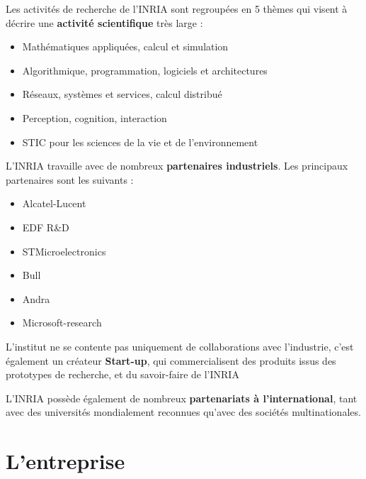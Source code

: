 \documentclass[a4paper, 11pt]{report}
\begin{document}
  Les activités de recherche de l'INRIA sont regroupées en 5 thèmes qui visent
  à décrire une \textbf{activité scientifique} très large :
  \begin{itemize}
    \item Mathématiques appliquées, calcul et simulation
    \item Algorithmique, programmation, logiciels et architectures
    \item Réseaux, systèmes et services, calcul distribué
    \item Perception, cognition, interaction
    \item STIC pour les sciences de la vie et de l'environnement
  \end{itemize}

  L'INRIA travaille avec de nombreux \textbf{partenaires industriels}.
  Les principaux partenaires sont les suivants :
  \begin{itemize}
    \item Alcatel-Lucent
    \item EDF R\&D
    \item STMicroelectronics
    \item Bull
    \item Andra
    \item Microsoft-research \\
  \end{itemize}

  L'institut ne se contente pas uniquement de collaborations avec l'industrie,
  c'est également un créateur \textbf{Start-up}, qui commercialisent des
  produits issus des prototypes de recherche, et du savoir-faire de l'INRIA

  L'INRIA possède également de nombreux \textbf{partenariats à
  l'international}, tant avec des universités mondialement reconnues qu'avec
  des sociétés multinationales.

  \section{L'entreprise}
\end{document}
